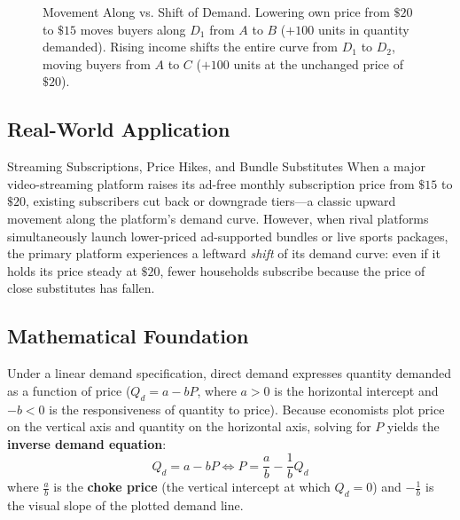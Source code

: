 \documentclass[11pt,letterpaper]{article}
\begin{document}
\begin{figure}[htbp]
\caption{Movement Along vs. Shift of Demand. Lowering own price from $\$20$ to $\$15$ moves buyers along $D_1$ from $A$ to $B$ ($+100$ units in quantity demanded). Rising income shifts the entire curve from $D_1$ to $D_2$, moving buyers from $A$ to $C$ ($+100$ units at the unchanged price of $\$20$).}
\label{fig:demand_shift_vs_movement}
\end{figure}

\subsection*{Real-World Application}
\begin{examplecase}{Streaming Subscriptions, Price Hikes, and Bundle Substitutes}
When a major video-streaming platform raises its ad-free monthly subscription price from $\$15$ to $\$20$, existing subscribers cut back or downgrade tiers—a classic upward movement along the platform's demand curve. However, when rival platforms simultaneously launch lower-priced ad-supported bundles or live sports packages, the primary platform experiences a leftward \emph{shift} of its demand curve: even if it holds its price steady at $\$20$, fewer households subscribe because the price of close substitutes has fallen.
\end{examplecase}

\subsection*{Mathematical Foundation}
Under a linear demand specification, direct demand expresses quantity demanded as a function of price ($Q_d = a - bP$, where $a > 0$ is the horizontal intercept and $-b < 0$ is the responsiveness of quantity to price). Because economists plot price on the vertical axis and quantity on the horizontal axis, solving for $P$ yields the \textbf{inverse demand equation}:
\begin{equation}
Q_d = a - bP \iff P = \frac{a}{b} - \frac{1}{b}Q_d
\end{equation}
where $\frac{a}{b}$ is the \textbf{choke price} (the vertical intercept at which $Q_d = 0$) and $-\frac{1}{b}$ is the visual slope of the plotted demand line.
\end{document}
